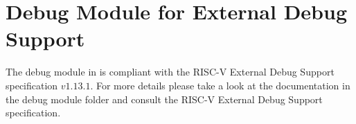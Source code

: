 \chapter{Debug Module for External Debug Support}
The debug module in \pulpissimo is compliant with the RISC-V External Debug
Support specification $v1.13.1$. For more details please take a look at the
documentation in the debug module folder and consult the RISC-V External Debug
Support specification.



